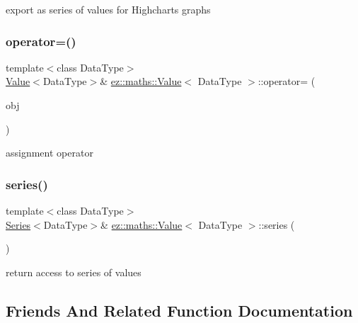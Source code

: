 export as series of values for Highcharts graphs \mbox{\label{classez_1_1maths_1_1Value_a79c473c4b510f71607c861ee806e4050}} 
\subsubsection{\texorpdfstring{operator=()}{operator=()}}
{\footnotesize\ttfamily template$<$class Data\+Type$>$ \\
\hyperlink{classez_1_1maths_1_1Value}{Value}$<$Data\+Type$>$\& \hyperlink{classez_1_1maths_1_1Value}{ez\+::maths\+::\+Value}$<$ Data\+Type $>$\+::operator= (\begin{DoxyParamCaption}\item[{const \hyperlink{classez_1_1maths_1_1Value}{Value}$<$ Data\+Type $>$ \&}]{obj }\end{DoxyParamCaption})\hspace{0.3cm}{\ttfamily [inline]}}

assignment operator \mbox{\label{classez_1_1maths_1_1Value_ad94111af5be1b5cb3fbde35d38f0d8a1}} 
\subsubsection{\texorpdfstring{series()}{series()}}
{\footnotesize\ttfamily template$<$class Data\+Type$>$ \\
\hyperlink{classez_1_1maths_1_1Series}{Series}$<$Data\+Type$>$\& \hyperlink{classez_1_1maths_1_1Value}{ez\+::maths\+::\+Value}$<$ Data\+Type $>$\+::series (\begin{DoxyParamCaption}{ }\end{DoxyParamCaption})\hspace{0.3cm}{\ttfamily [inline]}}

return access to series of values 

\subsection{Friends And Related Function Documentation}
\mbox{\label{classez_1_1maths_1_1Value_a16981d384689784ee36af11bddfc2af4}} 

